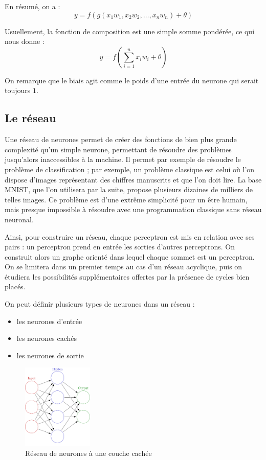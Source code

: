 \medskip

En résumé, on a :
\[y = f(g(x_1w_1, x_2w_2, \ldots , x_nw_n) + \theta) \]

\medskip

Usuellement, la fonction de composition est une simple somme pondérée,
ce qui nous donne :
\[y = f(\sum_{i=1}^n x_iw_i + \theta) \]

\medskip

On remarque que le biais agit comme le poids d'une entrée du neurone qui serait
toujours $1$.

\subsection{Le réseau}

Une réseau de neurones permet de créer des fonctions de bien plus grande
complexité qu'un simple neurone, permettant de résoudre des problèmes
jusqu'alors inaccessibles à la machine. Il permet par exemple de résoudre le
problème de classification ; par exemple, un problème classique est celui où l'on dispose
d'images représentant des chiffres manuscrits et que l'on doit lire.
La base MNIST, que l'on utilisera par la suite, propose plusieurs dizaines de milliers
de telles images. Ce problème est d'une extrême simplicité pour un être
humain, mais presque impossible à résoudre avec une programmation classique
sans réseau neuronal.

Ainsi, pour construire un réseau, chaque perceptron est
mis en relation avec ses pairs : un perceptron prend en entrée les sorties
d'autres perceptrons. On construit alors un graphe orienté dans lequel chaque
sommet est un perceptron. On se limitera dans un premier temps au cas d'un
réseau acyclique, puis on étudiera les possibilités supplémentaires offertes par
la présence de cycles bien placés.

\bigskip

On peut définir plusieurs types de neurones dans un réseau :
\begin{itemize}
\item les neurones d'entrée
\item les neurones cachés
\item les neurones de sortie
\end{itemize}

\bigskip

\begin{figure}[!ht]
\begin{center}
  \includegraphics[width=0.3\textwidth]{images/reseau_simple.png}
\end{center}
\caption{Réseau de neurones à une couche cachée}
\end{figure}

